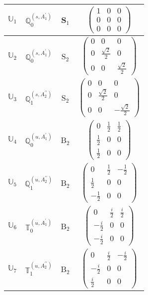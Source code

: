 \documentclass[fleqn,10pt,landscape]{article}
\begin{document}
\begin{itemize}
\begin{center}
\begin{longtable}{c|c|c|c}
$ \mathbb{U}_{1} $ & $\mathbb{Q}_{0}^{(s,A_{1}^{\prime})}$ & S$_{1}$ & $\begin{pmatrix} 1 & 0 & 0 \\ 0 & 0 & 0 \\ 0 & 0 & 0 \end{pmatrix}$ \\ \hline
$ \mathbb{U}_{2} $ & $\mathbb{Q}_{0}^{(s,A_{1}^{\prime})}$ & S$_{2}$ & $\begin{pmatrix} 0 & 0 & 0 \\ 0 & \frac{\sqrt{2}}{2} & 0 \\ 0 & 0 & \frac{\sqrt{2}}{2} \end{pmatrix}$ \\
$ \mathbb{U}_{3} $ & $\mathbb{Q}_{1}^{(s,A_{2}^{\prime\prime})}$ & S$_{2}$ & $\begin{pmatrix} 0 & 0 & 0 \\ 0 & \frac{\sqrt{2}}{2} & 0 \\ 0 & 0 & - \frac{\sqrt{2}}{2} \end{pmatrix}$ \\ \hline
$ \mathbb{U}_{4} $ & $\mathbb{Q}_{0}^{(u,A_{1}^{\prime})}$ & B$_{2}$ & $\begin{pmatrix} 0 & \frac{1}{2} & \frac{1}{2} \\ \frac{1}{2} & 0 & 0 \\ \frac{1}{2} & 0 & 0 \end{pmatrix}$ \\
$ \mathbb{U}_{5} $ & $\mathbb{Q}_{1}^{(u,A_{2}^{\prime\prime})}$ & B$_{2}$ & $\begin{pmatrix} 0 & \frac{1}{2} & - \frac{1}{2} \\ \frac{1}{2} & 0 & 0 \\ - \frac{1}{2} & 0 & 0 \end{pmatrix}$ \\
$ \mathbb{U}_{6} $ & $\mathbb{T}_{0}^{(u,A_{1}^{\prime})}$ & B$_{2}$ & $\begin{pmatrix} 0 & \frac{i}{2} & \frac{i}{2} \\ - \frac{i}{2} & 0 & 0 \\ - \frac{i}{2} & 0 & 0 \end{pmatrix}$ \\
$ \mathbb{U}_{7} $ & $\mathbb{T}_{1}^{(u,A_{2}^{\prime\prime})}$ & B$_{2}$ & $\begin{pmatrix} 0 & \frac{i}{2} & - \frac{i}{2} \\ - \frac{i}{2} & 0 & 0 \\ \frac{i}{2} & 0 & 0 \end{pmatrix}$ \\

\end{longtable}
\end{center}
\end{itemize}
\end{document}
